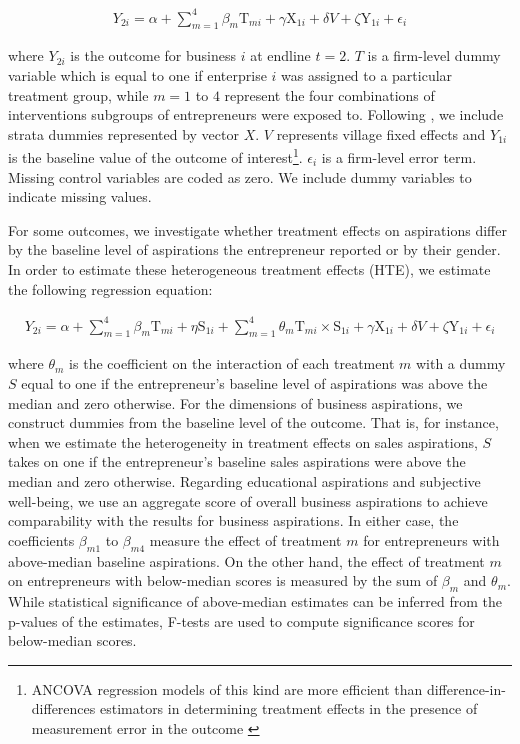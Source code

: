 \documentclass[11.5pt]{article}
\begin{document}
\begin{align}
    {Y}_{2i} = \alpha + \sum\limits_{m=1}^4 \beta_m \text{T}_{mi} + \gamma \text{X}_{1i} + \delta {V} + \zeta \text{Y}_{1i} + \epsilon_i \label{eq:1}
\end{align}

where ${Y}_{2i}$ is the outcome for business $i$ at endline $t=2$. $T$ is a firm-level dummy variable which is equal to one if enterprise $i$ was assigned to a particular treatment group, while $m = 1$ to $4$ represent the four combinations of interventions subgroups of entrepreneurs were exposed to. Following \citet{Bruhn2009}, we include strata dummies represented by vector $X$. $V$ represents village fixed effects and $Y_{1i}$ is the baseline value of the outcome of interest\footnote{ANCOVA regression models of this kind are more efficient than difference-in-differences estimators in determining treatment effects in the presence of measurement error in the outcome \citep{McKenzie2012}}. $\epsilon_i$ is a firm-level error term. Missing control variables are coded as zero. We include dummy variables to indicate missing values.

For some outcomes, we investigate whether treatment effects on aspirations differ by the baseline level of aspirations the entrepreneur reported or by their gender. In order to estimate these heterogeneous treatment effects (HTE), we estimate the following regression equation:

\begin{align}
    {Y}_{2i} = \alpha + \sum\limits_{m=1}^4 \beta_m \text{T}_{mi} + \eta \text{S}_{1i} + \sum\limits_{m=1}^4 \theta_m \text{T}_{mi} \times \text{S}_{1i} + \gamma \text{X}_{1i} + \delta {V} + \zeta \text{Y}_{1i} + \epsilon_i \label{eq:2}
\end{align}

where $\theta_m$ is the coefficient on the interaction of each treatment $m$ with a dummy $S$ equal to one if the entrepreneur's baseline level of aspirations was above the median and zero otherwise. For the dimensions of business aspirations, we construct dummies from the baseline level of the outcome. That is, for instance, when we estimate the heterogeneity in treatment effects on sales aspirations, $S$ takes on one if the entrepreneur's baseline sales aspirations were above the median and zero otherwise. Regarding educational aspirations and subjective well-being, we use an aggregate score of overall business aspirations to achieve comparability with the results for business aspirations. In either case, the coefficients $\beta_{m1}$ to $\beta_{m4}$ measure the effect of treatment $m$ for entrepreneurs with above-median baseline aspirations. On the other hand, the effect of treatment $m$ on entrepreneurs with below-median scores is measured by the sum of $\beta_m$ and $\theta_m$. While statistical significance of above-median estimates can be inferred from the p-values of the estimates, F-tests are used to compute significance scores for below-median scores.
\end{document}
